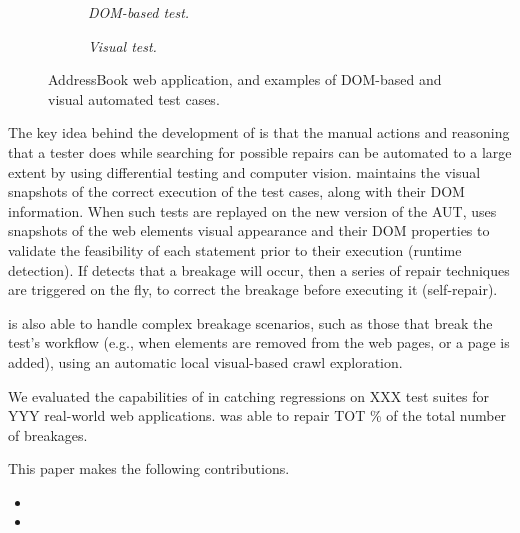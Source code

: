 \begin{figure}[t]
\begin{subfigure}{.25\linewidth}
\caption{\emph{DOM-based test.}}
\label{fig:ab-back-c} 
\end{subfigure}
\quad
\begin{subfigure}{.20\linewidth}
\centering
{}
\caption{\emph{Visual test.}}
\label{fig:ab-back-d} 
\end{subfigure}
\caption{AddressBook web application, and examples of DOM-based and visual automated test cases. }
\label{fig:ab-back}
\end{figure}


The key idea behind the development of \tool is that the manual actions and reasoning that a tester does while searching for possible repairs can be automated to a large extent by using differential testing and computer vision. 
\tool maintains the visual snapshots of the correct execution of the test cases, along with their DOM information. When such tests are replayed on the new version of the AUT, \tool uses snapshots of the web elements visual appearance and their DOM properties to validate the feasibility of each statement prior to their execution (runtime detection). If \tool detects that a breakage will occur, then a series of repair techniques are triggered on the fly, to correct the breakage before executing it (self-repair).

\tool is also able to handle complex breakage scenarios, such as those that break the test's workflow (e.g., when elements are removed from the web pages, or a page is added), using an automatic local visual-based crawl exploration.

We evaluated the capabilities of \tool in catching regressions on XXX test suites for YYY real-world web applications. \tool was able to repair TOT \% of the total number of breakages. 

This paper makes the following contributions.
\begin{itemize}
\item 
\item
\end{itemize}








